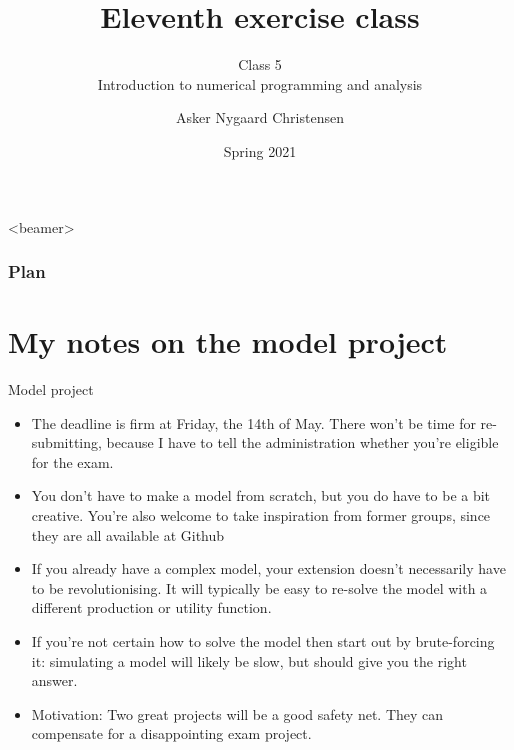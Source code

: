 \documentclass[10pt,danish,t,10pt]{beamer}
\title{Eleventh exercise class \vspace{-2mm}}
\subtitle{Class 5 \\Introduction to numerical programming and analysis \vspace{-4mm} }
\author{Asker Nygaard Christensen}
\date{Spring 2021}
\makeatletter
\let\origtableofcontents=\tableofcontents
\def\tableofcontents{\@ifnextchar[{\origtableofcontents}{\gobbletableofcontents}}
\def\gobbletableofcontents#1{\origtableofcontents}
\makeatother
\begin{document}
{
\begin{frame}

\maketitle


\end{frame}
}

\addtocounter{framenumber}{-1}

\begin{frame}<beamer>
\frametitle{Plan}

\tableofcontents[]
\end{frame}


\section{My notes on the model project}
\begin{frame}{Model project}

\begin{itemize}
    \item The deadline is firm at Friday, the 14th of May. There won't be time for re-submitting, because I have to tell the administration whether you're eligible for the exam.
    \item You don't have to make a model from scratch, but you do have to be a bit creative. You're also welcome to take inspiration from former groups, since they are all available at Github
    \item If you already have a complex model, your extension doesn't necessarily have to be revolutionising. It will typically be easy to re-solve the model with a different production or utility function.
    \item If you're not certain how to solve the model then start out by brute-forcing it: simulating a model will likely be slow, but should give you the right answer.
    \item Motivation: Two great projects will be a good safety net. They can compensate for a disappointing exam project.
\end{itemize}
\end{frame}
\end{document}
